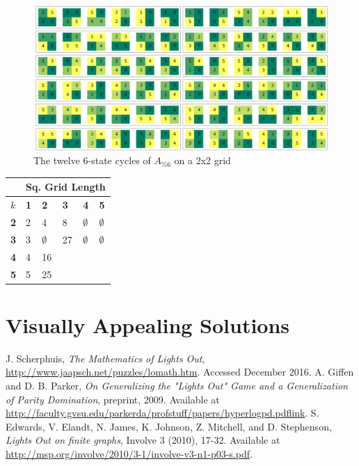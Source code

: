 \documentclass[11pt]{article}
\begin{document}
\begin{figure}
\caption{The twelve 6-state cycles of $A_{\% 6}$ on a 2x2 grid}
\label{cycle622}
\includegraphics[width=\textwidth]{all-len-6-cycles-622.png}
\end{figure}

\begin{tabular}{|l|l|l|l|l|l|}
  \hline
  & \multicolumn{5}{|c|}{Sq. Grid Length} \\ \hline
  $k$ & \textbf{1} & \textbf{2} & \textbf{3} & \textbf{4} & \textbf{5} \\ \hline
  \textbf{2} & 2 & 4 & 8 & $\emptyset$ & $\emptyset$ \\ \hline
  \textbf{3} & 3 & $\emptyset$ & 27 & $\emptyset$ & $\emptyset$ \\ \hline
  \textbf{4} & 4 & 16 & \\ \hline
  \textbf{5} & 5 & 25 \\ \hline
\end{tabular}


\section*{Visually Appealing Solutions}

\clearpage

\begin{thebibliography}{9}
  J. Scherphuis, \textit{The Mathematics of Lights Out},
  \href{http://www.jaapsch.net/puzzles/lomath.htm}{http://www.jaapsch.net/puzzles/lomath.htm}.
  Accessed December 2016.
  A. Giffen and D. B. Parker, \textit{On Generalizing the "Lights Out" Game and a Generalization of Parity Domination}, preprint, 2009. Available at \href{http://faculty.gvsu.edu/parkerda/profstuff/papers/hyperlogpd.pdf}{http://faculty.gvsu.edu/parkerda/profstuff/papers/hyperlogpd.pdflink}.
  S. Edwards, V. Elandt, N. James, K. Johnson, Z. Mitchell, and D. Stephenson, \textit{Lights Out on finite graphs}, Involve 3 (2010), 17-32. Available at \href{http://msp.org/involve/2010/3-1/involve-v3-n1-p03-s.pdf}{http://msp.org/involve/2010/3-1/involve-v3-n1-p03-s.pdf}.
\end{thebibliography}
\end{document}
